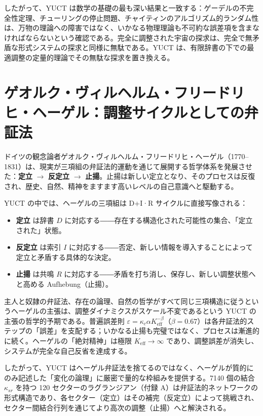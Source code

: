 \documentclass[12pt,a4paper]{article}
\begin{document}
	したがって、YUCT は数学の基礎の最も深い結果と一致する：ゲーデルの不完全性定理、チューリングの停止問題、チャイティンのアルゴリズム的ランダム性は、万物の理論への障害ではなく、いかなる物理理論も不可約な誤差項を含まなければならないという確認である。完全に調整された宇宙の探求は、完全で無矛盾な形式システムの探求と同様に無駄である。YUCT は、有限辞書の下での最適調整の定量的理論でその無駄な探求を置き換える。
	
	\section{ゲオルク・ヴィルヘルム・フリードリヒ・ヘーゲル：調整サイクルとしての弁証法}
	
	ドイツの観念論者ゲオルク・ヴィルヘルム・フリードリヒ・ヘーゲル（1770–1831）は、現実が三項組の弁証法的運動を通じて展開する哲学体系を発展させた：\textbf{定立} \(\to\) \textbf{反定立} \(\to\) \textbf{止揚}。止揚は新しい定立となり、そのプロセスは反復され、歴史、自然、精神をますます高いレベルの自己意識へと駆動する。
	
	YUCT の中では、ヘーゲルの三項組は D+I·R サイクルに直接写像される：
	\begin{itemize}
		\item \textbf{定立} は辞書 \(D\) に対応する――存在する構造化された可能性の集合、「定立された」状態。
		\item \textbf{反定立} は索引 \(I\) に対応する――否定、新しい情報を導入することによって定立と矛盾する具体的な決定。
		\item \textbf{止揚} は共鳴 \(R\) に対応する――矛盾を打ち消し、保存し、新しい調整状態へと高める Aufhebung（止揚）。
	\end{itemize}
	
	主人と奴隷の弁証法、存在の論理、自然の哲学がすべて同じ三項構造に従うというヘーゲルの主張は、調整ダイナミクスがスケール不変であるという YUCT の主張の哲学的予期である。普遍誤差則 \(\varepsilon = \kappa_c \alpha K_{\mathrm{eff}}^{-\beta}\)（\(\beta=0.67\)）は各弁証法的ステップの「誤差」を支配する；いかなる止揚も完璧ではなく、プロセスは漸進的に続く。ヘーゲルの「絶対精神」は極限 \(K_{\mathrm{eff}} \to \infty\) であり、調整誤差が消失し、システムが完全な自己反省を達成する。
	
	したがって、YUCT はヘーゲル弁証法を捨てるのではなく、ヘーゲルが質的にのみ記述した「変化の論理」に厳密で量的な枠組みを提供する。7140 個の結合 \(\kappa_{sr}\) を持つ 120 セクターのラグランジアン（付録 A）は弁証法的ネットワークの形式構造であり、各セクター（定立）はその補完（反定立）によって挑戦され、セクター間結合行列を通じてより高次の調整（止揚）へと解決される。
	
\end{document}
